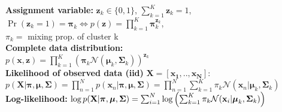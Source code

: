 \textbf{Assignment variable:} $\mathbf{z}_k \in \{0, 1\}$, $\sum_{k=1}^K \mathbf{z}_k = 1$, $\operatorname{Pr}(\mathbf{z}_k = 1) = \boldsymbol{\pi}_k \Leftrightarrow p(\mathbf{z}) = \prod_{k=1}^K \boldsymbol{\pi}_k^{\mathbf{z}_k}$, \\ $\pi_k=$ mixing prop. of cluster k \\
\textbf{Complete data distribution:} \\ $p(\mathbf{x}, \mathbf{z}) = \prod_{k=1}^K \left( \boldsymbol{\pi}_k \mathcal{N}(\boldsymbol{\mu}_k, \boldsymbol{\Sigma}_k) \right)^{\mathbf{z}_k}$ \\
\textbf{Likelihood of observed data (iid)} $\mathbf{X=[x_1,..,x_N]}$: $p(\mathbf{X} | \boldsymbol{\pi}, \boldsymbol{\mu}, \boldsymbol{\Sigma}) = \prod_{n=1}^N p(\mathbf{x}_n | \boldsymbol{\pi}, \boldsymbol{\mu}, \boldsymbol{\Sigma}) = \prod_{n=1}^N \sum_{k=1}^K \pi_k \mathcal{N}(\mathbf{x}_n | \boldsymbol{\mu}_k, \boldsymbol{\Sigma}_k)$ \\
\textbf{Log-likelihood:} $\log p(\mathbf{X} | \boldsymbol{\pi}, \boldsymbol{\mu}, \boldsymbol{\Sigma}) =\break \sum_{i=1}^N \log \left( \sum_{k=1}^K \pi_k \mathcal{N}(\mathbf{x}_i | \boldsymbol{\mu}_k, \boldsymbol{\Sigma}_k) \right)$